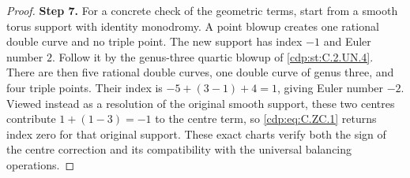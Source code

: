 \begin{proof}
\noindent\textbf{Step 7.} For a concrete check of the geometric
terms, start from a smooth torus support
with identity monodromy. A point blowup
creates one rational double curve and
no triple point. The new support has
index $-1$ and Euler number $2$.
Follow it by the genus-three quartic
blowup of \ref{cdp:st:C.2.UN.4}. There are then five
rational double curves, one double
curve of genus three, and four triple
points. Their index is
$-5+(3-1)+4=1$, giving Euler number
$-2$. Viewed instead as a resolution
of the original smooth support, these
two centres contribute
$1+(1-3)=-1$ to the centre term,
so \eqref{cdp:eq:C.ZC.1} returns index zero for
that original support. These exact
charts verify both the sign of the
centre correction and its compatibility
with the universal balancing operations.
\end{proof}
